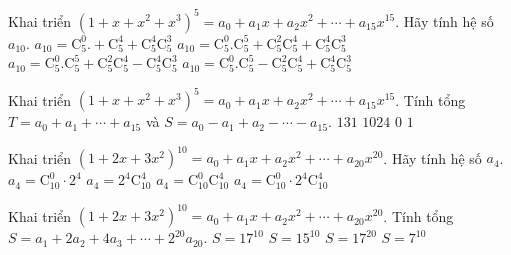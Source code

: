 \begin{ex}
	Khai triển $(1+x+x^2+x^3)^5=a_0+a_1x+a_2x^2+\cdots+a_{15}x^{15}$. Hãy tính hệ số $a_{10}$.
	\choice
	{$a_{10}=\mathrm{C}_5^0.+\mathrm{C}_5^4+\mathrm{C}_5^4\mathrm{C}_5^3$}
	{\True $a_{10}=\mathrm{C}_5^0.\mathrm{C}_5^5+\mathrm{C}_5^2\mathrm{C}_5^4+\mathrm{C}_5^4\mathrm{C}_5^3$}
	{$a_{10}=\mathrm{C}_5^0.\mathrm{C}_5^5+\mathrm{C}_5^2\mathrm{C}_5^4-\mathrm{C}_5^4\mathrm{C}_5^3$}
	{$a_{10}=\mathrm{C}_5^0.\mathrm{C}_5^5-\mathrm{C}_5^2\mathrm{C}_5^4+\mathrm{C}_5^4\mathrm{C}_5^3$}
\end{ex}

\begin{ex}
	Khai triển $(1+x+x^2+x^3)^5=a_0+a_1x+a_2x^2+\cdots+a_{15}x^{15}$. Tính tổng $T=a_0+a_1+\cdots+a_{15}$ và $S=a_0-a_1+a_2-\cdots-a_{15}$.
	\choice
	{$131$}
	{\True $1024$}
	{$0$}
	{$1$}
\end{ex}

\begin{ex}
	Khai triển $(1+2x+3x^2)^{10}=a_0+a_1x+a_2x^2+\cdots+a_{20}x^{20}$. Hãy tính hệ số $a_4$.
	\choice
	{$a_4=\mathrm{C}_{10}^0\cdot 2^4$}
	{$a_4=2^4\mathrm{C}_{10}^4$}
	{$a_4=\mathrm{C}_{10}^0\mathrm{C}_{10}^4$}
	{\True $a_4=\mathrm{C}_{10}^0\cdot 2^4\mathrm{C}_{10}^4$}
\end{ex}

\begin{ex}
	Khai triển $(1+2x+3x^2)^{10}=a_0+a_1x+a_2x^2+\cdots+a_{20}x^{20}$. Tính tổng $S=a_1+2a_2+4a_3+\cdots+2^{20}a_{20}$.
	\choice
	{\True $S=17^{10}$}
	{$S=15^{10}$}
	{$S=17^{20}$}
	{$S=7^{10}$}
\end{ex}

